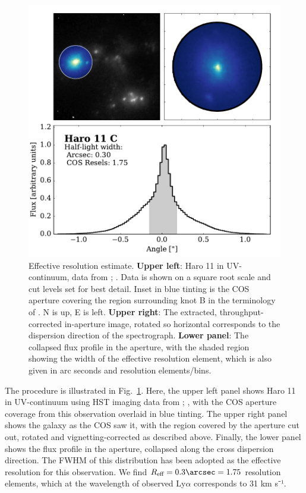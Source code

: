 \documentclass[twocolumn]{aastex61}
\begin{document}
\begin{figure}
\centering
\includegraphics[width=1.000\hsize]{../Figs/EffResol.pdf}
\caption{Effective resolution estimate. \textbf{Upper left}: Haro 11 in
UV-continuum, data from \citet{Ostlin2009}; \citet{Hayes2009}. Data is
shown on a square root scale and cut levels set for best detail. Inset
in blue tinting is the COS aperture covering the region surrounding knot
B in the terminology of \citet{Vader1993}. N is up, E is left.
\textbf{Upper right}: The extracted, throughput-corrected in-aperture
image, rotated so horizontal corresponds to the dispersion direction of
the spectrograph. \textbf{Lower panel}: The collapsed flux profile in
the aperture, with the shaded region showing the width of the effective
resolution element, which is also given in arc seconds and resolution
elements/bins.}\label{fig:resol}
\end{figure}

The procedure is illustrated in Fig.~\ref{fig:resol}. Here, the upper
left panel shows Haro 11 in UV-continuum using HST imaging data from
\citet{Ostlin2009}; \citet{Hayes2009}, with the COS aperture coverage
from this observation overlaid in blue tinting. The upper right panel
shows the galaxy as the COS saw it, with the region covered by the
aperture cut out, rotated and vignetting-corrected as described above.
Finally, the lower panel shows the flux profile in the aperture,
collapsed along the cross dispersion direction. The FWHM of this
distribution has been adopted as the effective resolution for this
observation. We find $R_{\text{eff}} = 0.3 \arcsec = 1.75$ resolution
elements, which at the wavelength of observed Ly$\alpha$ corresponds to
31 km s⁻¹.
\end{document}
